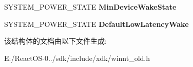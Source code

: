 \begin{DoxyCompactItemize}
\item 
\mbox{\label{struct___s_y_s_t_e_m___p_o_w_e_r___c_a_p_a_b_i_l_i_t_i_e_s_a13a3e939b9f9bc4a8db1e5783aebc41f}} 
S\+Y\+S\+T\+E\+M\+\_\+\+P\+O\+W\+E\+R\+\_\+\+S\+T\+A\+TE {\bfseries Min\+Device\+Wake\+State}
\item 
\mbox{\label{struct___s_y_s_t_e_m___p_o_w_e_r___c_a_p_a_b_i_l_i_t_i_e_s_a3ecc88cf1d964d9f623c7408955307a1}} 
S\+Y\+S\+T\+E\+M\+\_\+\+P\+O\+W\+E\+R\+\_\+\+S\+T\+A\+TE {\bfseries Default\+Low\+Latency\+Wake}
\end{DoxyCompactItemize}


该结构体的文档由以下文件生成\+:\begin{DoxyCompactItemize}
\item 
E\+:/\+React\+O\+S-\/0../sdk/include/xdk/winnt\+\_\+old.\+h\end{DoxyCompactItemize}
